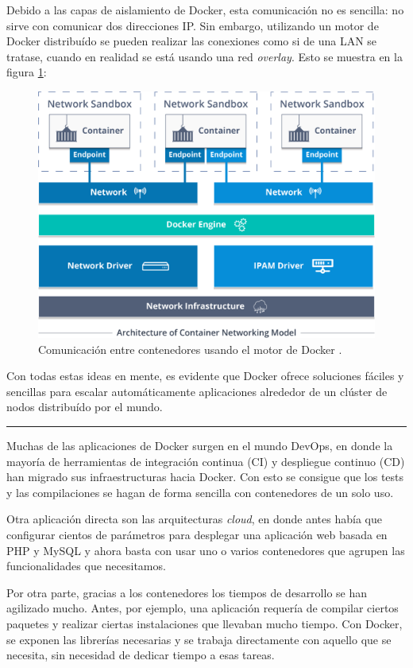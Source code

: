 Debido a las capas de aislamiento de Docker, esta comunicación no es sencilla: no sirve
con comunicar dos direcciones IP. Sin embargo, utilizando un motor de Docker distribuído
se pueden realizar las conexiones como si de una LAN se tratase, cuando en realidad se
está usando una red \textit{overlay}. Esto se muestra en la figura \ref{fig:docker-network}:

\begin{figure}[H]
    \centering
    \includegraphics[width=.7\linewidth]{pictures/docker-networking.png}
    \caption{Comunicación entre contenedores usando el motor de Docker \cite{kulshresthaDockerNetworkingExplore2020}.}
    \label{fig:docker-network}
\end{figure}

Con todas estas ideas en mente, es evidente que Docker ofrece soluciones fáciles
y sencillas para escalar automáticamente aplicaciones alrededor de un clúster de
nodos distribuído por el mundo.

\noindent\rule{\linewidth}{.2pt}

Muchas de las aplicaciones de Docker surgen en el mundo DevOps, en donde la mayoría de
herramientas de integración continua (CI) y despliegue continuo (CD) han migrado sus
infraestructuras hacia Docker. Con esto se consigue que los tests y las compilaciones
se hagan de forma sencilla con contenedores de un solo uso.

Otra aplicación directa son las arquitecturas \textit{cloud}, en donde antes había que
configurar cientos de parámetros para desplegar una aplicación web basada en PHP y 
MySQL y ahora basta con usar uno o varios contenedores que agrupen las funcionalidades
que necesitamos.

Por otra parte, gracias a los contenedores los tiempos de desarrollo se han agilizado
mucho. Antes, por ejemplo, una aplicación requería de compilar ciertos paquetes
y realizar ciertas instalaciones que llevaban mucho tiempo. Con Docker, se exponen
las librerías necesarias y se trabaja directamente con aquello que se necesita,
sin necesidad de dedicar tiempo a esas tareas.
